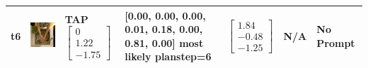\begin{longtable}{| V{0.8cm} | V{2.6cm} | V{1.6cm} | V{2.1cm} | V{1.55cm} | V{1.6cm} | V{3.2cm} |}
t6 &
\includegraphics[width=\linewidth]{fig/system/_slow2-tap2_.jpg} &
TAP
\linebreak\linebreak
$\begin{bmatrix}
0 \\
1.22 \\
-1.75
\end{bmatrix}$ &
[0.00, 0.00, 0.00, 0.01, 0.18, 0.00, 0.81, 0.00] most likely planstep=6 &
$\begin{bmatrix}
1.84 \\
-0.48 \\
-1.25
\end{bmatrix}$ &
N/A &
No Prompt
\\ \hline



\end{longtable}
